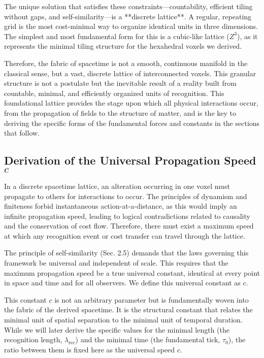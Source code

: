 \documentclass[11pt,a4paper]{article}
\begin{document}
The unique solution that satisfies these constraints—countability, efficient tiling without gaps, and self-similarity—is a **discrete lattice**. A regular, repeating grid is the most cost-minimal way to organize identical units in three dimensions. The simplest and most fundamental form for this is a cubic-like lattice (\(Z^3\)), as it represents the minimal tiling structure for the hexahedral voxels we derived.

Therefore, the fabric of spacetime is not a smooth, continuous manifold in the classical sense, but a vast, discrete lattice of interconnected voxels. This granular structure is not a postulate but the inevitable result of a reality built from countable, minimal, and efficiently organized units of recognition. This foundational lattice provides the stage upon which all physical interactions occur, from the propagation of fields to the structure of matter, and is the key to deriving the specific forms of the fundamental forces and constants in the sections that follow.

\subsection{Derivation of the Universal Propagation Speed \texorpdfstring{$c$}{c}}
In a discrete spacetime lattice, an alteration occurring in one voxel must propagate to others for interactions to occur. The principles of dynamism and finiteness forbid instantaneous action-at-a-distance, as this would imply an infinite propagation speed, leading to logical contradictions related to causality and the conservation of cost flow. Therefore, there must exist a maximum speed at which any recognition event or cost transfer can travel through the lattice.

The principle of self-similarity (Sec. 2.5) demands that the laws governing this framework be universal and independent of scale. This requires that the maximum propagation speed be a true universal constant, identical at every point in space and time and for all observers. We define this universal constant as \(c\).

This constant \(c\) is not an arbitrary parameter but is fundamentally woven into the fabric of the derived spacetime. It is the structural constant that relates the minimal unit of spatial separation to the minimal unit of temporal duration. While we will later derive the specific values for the minimal length (the recognition length, \(\lambda_{\text{rec}}\)) and the minimal time (the fundamental tick, \(\tau_0\)), the ratio between them is fixed here as the universal speed \(c\).
\end{document}
